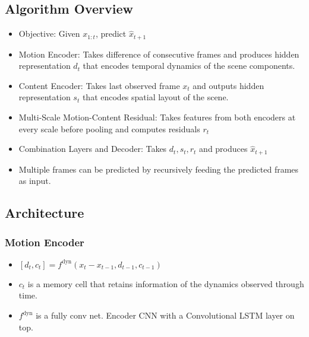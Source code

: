 \documentclass{article}
\begin{document}
    \subsection{Algorithm Overview}\label{subsec:Decomposing_Motion_and_Content_for_Natural_Video_Sequence_Prediction:algorithm-overview}
    \begin{itemize}
        \item Objective: Given $x_{1:t}$, predict $\hat{x}_{t+1}$
        \item Motion Encoder: Takes difference of consecutive frames and produces hidden representation $d_t$ that encodes temporal dynamics of the scene components.
        \item Content Encoder: Takes last observed frame $x_t$ and outputs hidden representation $s_t$ that encodes spatial layout of the scene.
        \item Multi-Scale Motion-Content Residual: Takes features from both encoders at every scale before pooling and computes residuals $r_t$
        \item Combination Layers and Decoder: Takes $d_t, s_t, r_t$ and produces $\hat{x}_{t+1}$
        \item Multiple frames can be predicted by recursively feeding the predicted frames as input.
    \end{itemize}

    \subsection{Architecture}\label{subsec:Decomposing_Motion_and_Content_for_Natural_Video_Sequence_Prediction:architecture}

    \subsubsection{Motion Encoder}\label{subsubsec:Decomposing_Motion_and_Content_for_Natural_Video_Sequence_Prediction:motion-encoder}
    \begin{itemize}
        \item $[d_t, c_t] = f^{\textrm{dyn}}(x_t - x_{t-1}, d_{t-1}, c_{t-1})$
        \item $c_t$ is a memory cell that retains information of the dynamics observed through time.
        \item $f^{\textrm{dyn}}$ is a fully conv net.
        Encoder CNN with a Convolutional LSTM layer on top.
    \end{itemize}
\end{document}
